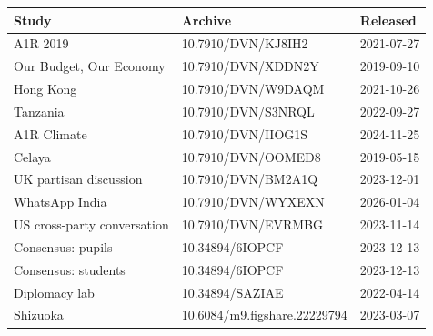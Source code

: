 
\begin{tabular}{lll}
\toprule
Study & Archive & Released\\
\midrule
A1R 2019 & 10.7910/DVN/KJ8IH2 & 2021-07-27\\
Our Budget, Our Economy & 10.7910/DVN/XDDN2Y & 2019-09-10\\
Hong Kong & 10.7910/DVN/W9DAQM & 2021-10-26\\
Tanzania & 10.7910/DVN/S3NRQL & 2022-09-27\\
A1R Climate & 10.7910/DVN/IIOG1S & 2024-11-25\\
\addlinespace
Celaya & 10.7910/DVN/OOMED8 & 2019-05-15\\
UK partisan discussion & 10.7910/DVN/BM2A1Q & 2023-12-01\\
WhatsApp India & 10.7910/DVN/WYXEXN & 2026-01-04\\
US cross-party conversation & 10.7910/DVN/EVRMBG & 2023-11-14\\
Consensus: pupils & 10.34894/6IOPCF & 2023-12-13\\
\addlinespace
Consensus: students & 10.34894/6IOPCF & 2023-12-13\\
Diplomacy lab & 10.34894/SAZIAE & 2022-04-14\\
Shizuoka & 10.6084/m9.figshare.22229794 & 2023-03-07\\
\bottomrule
\end{tabular}
